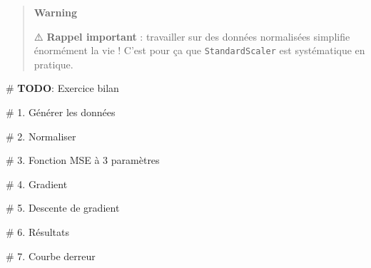 \documentclass[
  french,
  11pt,
  a4paper,
]{scrbook}
\newenvironment{Shaded}{}{}
\newcommand{\AlertTok}[1]{\textcolor[rgb]{1.00,0.33,0.33}{\textbf{#1}}}
\newcommand{\CommentTok}[1]{\textcolor[rgb]{0.42,0.45,0.49}{#1}}
\begin{document}
\begin{tcolorbox}
\begin{quote}
\textbf{Warning}

⚠️ \textbf{Rappel important} : travailler sur des données normalisées
simplifie énormément la vie ! C'est pour ça que \texttt{StandardScaler}
est systématique en pratique.
\end{quote}

\end{tcolorbox}

\begin{Shaded}
\begin{Highlighting}[]
\CommentTok{\# }\AlertTok{TODO}\CommentTok{: Exercice bilan}

\CommentTok{\# 1. Générer les données}


\CommentTok{\# 2. Normaliser}


\CommentTok{\# 3. Fonction MSE à 3 paramètres}


\CommentTok{\# 4. Gradient}


\CommentTok{\# 5. Descente de gradient}


\CommentTok{\# 6. Résultats}


\CommentTok{\# 7. Courbe d\textquotesingle{}erreur}
\end{Highlighting}
\end{Shaded}
\end{document}

